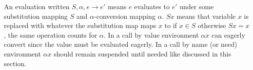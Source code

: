 \documentclass[11pt,oneside,a4paper]{report}
\begin{document}
An evaluation written $S, \alpha, e \rightarrow e'$ means $e$ evaluates to $e'$ under some substitution mapping $S$ and $\alpha$-conversion mapping $\alpha$.
$Sx$ means that variable $x$ is replaced with whatever the substitution map maps $x$ to if $x \in S$ otherwise $Sx = x$, the same operation counts for $\alpha$.
In a call by value environment $\alpha x$ can eagerly convert since the value must be evaluated eagerly.
In a call by name (or need) environment $\alpha x$ should remain suspended until needed like discussed in this section.

\end{document}
